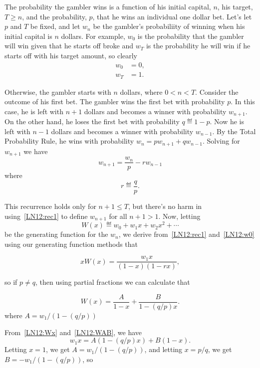 The probability the gambler wins is a function of his initial capital,
$n$, his target, $T \geq n$, and the probability, $p$, that he wins an
individual one dollar bet.  Let's let $p$ and $T$ be fixed, and let $w_n$
be the gambler's probabiliity of winning when his initial capital is $n$
dollars.  For example, $w_0$ is the probability that the gambler will win
given that he starts off broke and $w_T$ is the probability he will win if
he starts off with his target amount, so clearly
\begin{align}
w_0 & = 0,\label{LN12:w0}\\
w_T & = 1. \label{LN12:wT}
\end{align}

Otherwise, the gambler starts with $n$ dollars, where $0 < n < T$.
Consider the outcome of his first bet.  The gambler wins the first bet
with probability $p$.  In this case, he is left with $n+1$ dollars and
becomes a winner with probability $w_{n+1}$.  On the other hand, he loses
the first bet with probability $q \eqdef 1-p$.  Now he is left with $n-1$
dollars and becomes a winner with probability $w_{n-1}$.  By the Total
Probability Rule, he wins with probability $w_n = p w_{n+1} + q w_{n-1}$.
Solving for $w_{n+1}$ we have
\begin{equation}\label{LN12:rec1}
w_{n+1} = \frac{w_n}{p} -r w_{n-1}
\end{equation}
where
\[
r \eqdef \frac{q}{p}.
\]

This recurrence holds only for $n+1 \leq T$, but there's no harm in
using~\eqref{LN12:rec1} to define $w_{n+1}$ for all $n+1 >1$.  Now, letting
\[
W(x) \eqdef w_0 + w_1x + w_2x^2 + \cdots
\]
be the generating function for the $w_n$, we derive from~\eqref{LN12:rec1}
and~\eqref{LN12:w0} using our generating function methods that

\begin{equation}\label{LN12:Wx}
xW(x) = \frac{w_1x}{(1-x)(1-rx)},
\end{equation}

so if $p \neq q$, then using partial fractions we can calculate that

\begin{staffnotes}
\begin{equation}\label{LN12:WAB}
W(x)= \frac{A}{1-x} + \frac{B}{1-(q/p)x}.
\end{equation}
where $A=w_1/(1-(q/p))$

From~\eqref{LN12:Wx} and~\eqref{LN12:WAB}, we have
\[
w_1x = A(1-(q/p)x) + B(1-x).
\]
Letting $x=1$, we get $A=w_1/(1-(q/p))$, and letting $x=p/q$, we get
$B=-w_1/(1-(q/p))$, so

\end{staffnotes}

